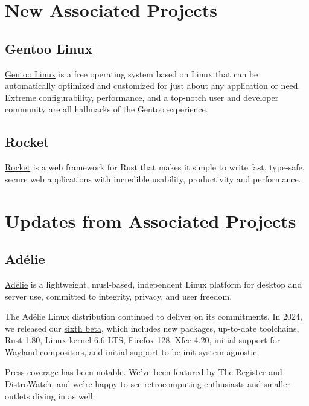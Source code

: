 \documentclass[a4paper]{report}
\begin{document}
\section{New Associated Projects}

\subsection{Gentoo Linux}

\href{https://www.gentoo.org/}{Gentoo Linux} is a free operating system based on Linux that can be automatically optimized and customized for just about any application or need. Extreme configurability, performance, and a top-notch user and developer community are all hallmarks of the Gentoo experience.

\subsection{Rocket}

\href{https://rocket.rs/}{Rocket} is a web framework for Rust that makes it simple to write fast, type-safe, secure web applications with incredible usability, productivity and performance.

\section{Updates from Associated Projects}

\subsection{Adélie}

\href{https://www.adelielinux.org/}{Adélie} is a lightweight, musl-based, independent Linux platform for desktop and server use, committed to integrity, privacy, and user freedom.

The Adélie Linux distribution continued to deliver on its commitments. In 2024, we released our \href{https://blog.adelielinux.org/2024/12/15/adelie-linux-1-0-beta6-released/}{sixth beta}, which includes new packages, up-to-date toolchains, Rust 1.80, Linux kernel 6.6 LTS, Firefox 128, Xfce 4.20, initial support for Wayland compositors, and initial support to be init-system-agnostic.

Press coverage has been notable. We’ve been featured by \href{https://www.theregister.com/2024/12/20/adelie_linux_1_beta_6/}{The Register} and \href{https://distrowatch.com/weekly.php?issue=20240212}{DistroWatch}, and we’re happy to see retrocomputing enthusiasts and smaller outlets diving in as well.
\end{document}
